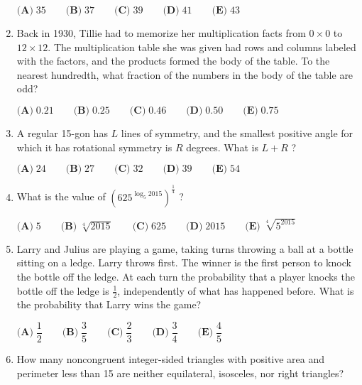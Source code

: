 \documentclass{article}
\begin{document}
\begin{enumerate}[label=\arabic*., itemsep=0.5em]
$\textbf{(A)}\; 35 \qquad  \textbf{(B)}\; 37 \qquad \textbf{(C)}\; 39 \qquad \textbf{(D)}\; 41 \qquad \textbf{(E)}\; 43$\par \vspace{0.5em}\item Back in 1930, Tillie had to memorize her multiplication facts from $0 \times 0$ to $12 \times 12$. The multiplication table she was given had rows and columns labeled with the factors, and the products formed the body of the table. To the nearest hundredth, what fraction of the numbers in the body of the table are odd?

$\textbf{(A)}\; 0.21 \qquad\textbf{(B)}\; 0.25 \qquad\textbf{(C)}\; 0.46 \qquad\textbf{(D)}\; 0.50 \qquad\textbf{(E)}\; 0.75$\par \vspace{0.5em}\item A regular 15-gon has $L$ lines of symmetry, and the smallest positive angle for which it has rotational symmetry is $R$ degrees. What is $L+R$ ?

$\textbf{(A)}\; 24 \qquad\textbf{(B)}\; 27 \qquad\textbf{(C)}\; 32 \qquad\textbf{(D)}\; 39 \qquad\textbf{(E)}\; 54$\par \vspace{0.5em}\item What is the value of $(625^{\log_5 2015})^{\frac{1}{4}}$ ?

$\textbf{(A)}\; 5 \qquad\textbf{(B)}\; \sqrt[4]{2015} \qquad\textbf{(C)}\; 625 \qquad\textbf{(D)}\; 2015 \qquad\textbf{(E)}\; \sqrt[4]{5^{2015}}$\par \vspace{0.5em}\item Larry and Julius are playing a game, taking turns throwing a ball at a bottle sitting on a ledge. Larry throws first. The winner is the first person to knock the bottle off the ledge. At each turn the probability that a player knocks the bottle off the ledge is $\tfrac{1}{2}$, independently of what has happened before. What is the probability that Larry wins the game?

$\textbf{(A)}\; \dfrac{1}{2} \qquad\textbf{(B)}\; \dfrac{3}{5} \qquad\textbf{(C)}\; \dfrac{2}{3} \qquad\textbf{(D)}\; \dfrac{3}{4} \qquad\textbf{(E)}\; \dfrac{4}{5}$\par \vspace{0.5em}\item How many noncongruent integer-sided triangles with positive area and perimeter less than 15 are neither equilateral, isosceles, nor right triangles?


\end{enumerate}
\end{document}
